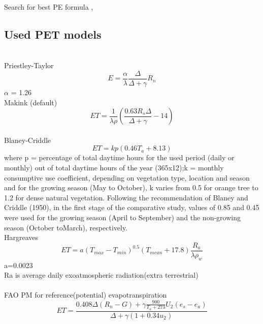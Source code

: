 \documentclass[hydrology,article,submit,moreauthors,pdftex]{Definitions/mdpi}
\begin{document}
Search for best PE formula \cite{jensen1990evapotranspiration}, \cite{xu2002cross}

\subsection{Used PET models}
\cite{xu2002cross} \\
Priestley-Taylor \cite{asce2005asce}
\begin{equation}
E = \frac{\alpha}{\lambda} \frac{\Delta}{\Delta +\gamma}R_{n}
\end{equation}
$\alpha$ = 1.26
\\
Makink (default) \cite{asce2005asce} \cite{makkink1957testing}
\begin{equation}
ET = \frac{1}{\lambda \rho} \left(\frac{0.63 R_s \Delta}{\Delta+\gamma}-14 \right)
\end{equation}
\\
Blaney-Criddle \cite{asce2005asce} \\
\begin{equation}
ET = kp (0.46T_a+8.13) 
\end{equation}
where p = percentage of total daytime hours for the used period (daily or
monthly) out of total daytime hours of the year (365x12);k = monthly consumptive use coefficient, depending on vegetation
type, location and season and for the growing season (May to October),
k varies from 0.5 for orange tree to 1.2 for dense natural
vegetation.
Following the recommendation of Blaney and Criddle (1950)\cite{blaney1950determining}, in the first stage of
the comparative study, values of 0.85 and 0.45 were used for the growing season
(April to September) and the non-growing season (October toMarch), respectively.
\\
Hargreaves \cite{hargreaves1975moisture}\cite{hargreaves1985reference}\cite{hargreaves1982estimating}
\begin{equation}
ET = a(T_{max}-T_{min})^{0.5}(T_{mean}+17.8) \frac{R_a}{\lambda \rho _w}
\end{equation}
a=0.0023 \\
Ra is average daily exoatmospheric radiation(extra terrestrial) \\
\\
FAO PM for reference(potential) evapotranspiration \cite{allen1998crop}
\begin{equation}
ET = \frac{0.408\Delta (R_{n}-G) + \gamma \frac{900}{T_a + 273} U_2 (e_{s}-e_{a})}{\Delta +\gamma (1+0.34u_2)}
\end{equation}
\\
\end{document}
